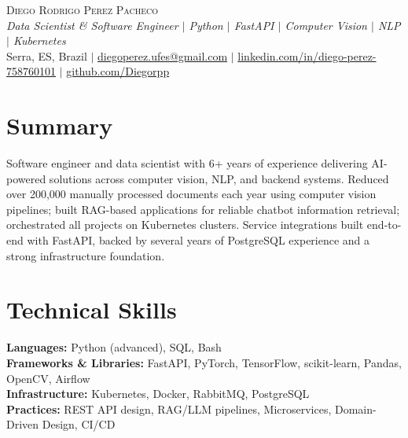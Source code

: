 \documentclass[letterpaper,10pt]{article}
\begin{document}

\begin{center}
  {\Huge \scshape Diego Rodrigo Perez Pacheco} \\ \vspace{2pt}
  {\small\textit{Data Scientist \& Software Engineer $|$ Python $|$ FastAPI $|$ Computer Vision $|$ NLP $|$ Kubernetes}} \\ \vspace{4pt}
  \small
  Serra, ES, Brazil \quad $|$ \quad
  \href{mailto:diegoperez.ufes@gmail.com}{diegoperez.ufes@gmail.com} \quad $|$ \quad
  \href{https://linkedin.com/in/diego-perez-758760101}{linkedin.com/in/diego-perez-758760101} \quad $|$ \quad
  \href{https://github.com/Diegorpp}{github.com/Diegorpp}
\end{center}


\section{Summary}
Software engineer and data scientist with 6+ years of experience delivering AI-powered solutions across
computer vision, NLP, and backend systems. Reduced over 200,000 manually processed documents each year using
computer vision pipelines; built RAG-based applications for reliable chatbot information retrieval;
orchestrated all projects on Kubernetes clusters. Service integrations built end-to-end with FastAPI,
backed by several years of PostgreSQL experience and a strong infrastructure foundation.


\section{Technical Skills}
\begin{itemize}[leftmargin=0.15in, label={}]
  \small{\item{
    \textbf{Languages:} Python (advanced), SQL, Bash \\
    \textbf{Frameworks \& Libraries:} FastAPI, PyTorch, TensorFlow, scikit-learn, Pandas, OpenCV, Airflow \\
    \textbf{Infrastructure:} Kubernetes, Docker, RabbitMQ, PostgreSQL \\
    \textbf{Practices:} REST API design, RAG/LLM pipelines, Microservices, Domain-Driven Design, CI/CD
  }}
\end{itemize}
\end{document}
